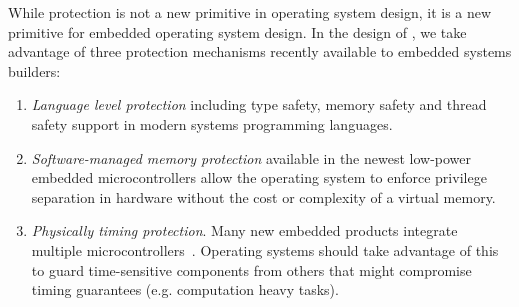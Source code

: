 While protection is not a new primitive in operating system design, it is a
new primitive for embedded operating system design. In the design of \name, we
take advantage of three protection mechanisms recently available to embedded
systems builders:

\begin{enumerate}
  \item \emph{Language level protection} including type safety, memory safety
    and thread safety support in modern systems programming languages.
  \item \emph{Software-managed memory protection} available in the newest
    low-power embedded microcontrollers allow the operating system to enforce
    privilege separation in hardware without the cost or complexity of a virtual
    memory.
  \item \emph{Physically timing protection}. Many new embedded products
    integrate multiple microcontrollers~.
  Operating systems should take advantage of this to guard time-sensitive
  components from others that might compromise timing guarantees (e.g.
  computation heavy tasks).
\end{enumerate}

